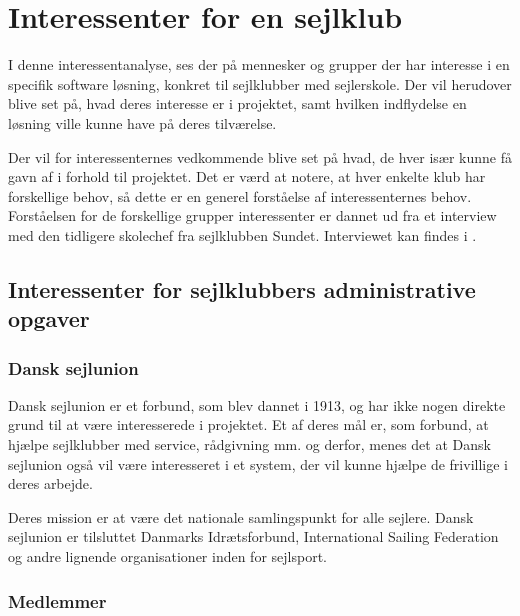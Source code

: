 \chapter{Interessenter for en sejlklub}\label{chap:interessent-analyse-ved-sejlklubber}

I denne interessentanalyse, ses der på mennesker og grupper der har interesse i en specifik software løsning, konkret
til sejlklubber med sejlerskole. Der vil herudover blive set på, hvad deres interesse er i projektet, samt hvilken
indflydelse en løsning ville kunne have på deres tilværelse.


Der vil for interessenternes vedkommende blive set på hvad, de hver især kunne få gavn af i forhold til projektet. 
Det er værd at notere, at hver enkelte klub har forskellige behov, så dette er en generel forståelse af interessenternes
behov. Forståelsen for de forskellige grupper interessenter er dannet ud fra et interview med den tidligere skolechef fra sejlklubben Sundet. Interviewet kan findes i .

\section{Interessenter for sejlklubbers administrative opgaver}

\subsection{Dansk sejlunion}

Dansk sejlunion er et forbund, som blev dannet i 1913, og har ikke nogen direkte grund til at være interesserede i
projektet. 
Et af deres mål er, som forbund, at hjælpe sejlklubber med service, rådgivning mm. og derfor, menes det at Dansk sejlunion
også vil være interesseret i et system, der vil kunne hjælpe de frivillige i deres arbejde.

Deres mission er at være det nationale samlingspunkt for alle sejlere. Dansk sejlunion er tilsluttet Danmarks
Idrætsforbund, International Sailing Federation og andre lignende organisationer inden for sejlsport.
\citep{Sejlsportdk} 


\subsection{Medlemmer}

